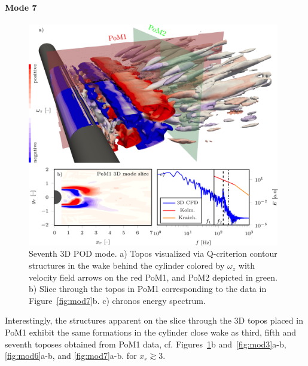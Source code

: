 {{{\paragraph{Mode 7}
\begin{figure}[htbp]
    \centering
    \includegraphics[width=0.98\textwidth]{02_images/00_export/figure22.png}
    \caption{{Seventh 3D POD mode. a)} Topos {visualized via} Q-criterion contour structures in the wake behind the cylinder colored by $\omega_z$ with velocity field arrows on the red PoM1, and PoM2 depicted in green. {b) Slice through the topos in PoM1 corresponding to the data in Figure~\ref{fig:mod7}b. c) chronos energy spectrum.}}
    \label{fig:3Dmod7}
\end{figure}
 Interestingly, the structures apparent on the slice through the 3D topos placed in PoM1 exhibit the same formations in the cylinder close wake as third, fifth and seventh toposes obtained from PoM1 data, cf. Figures~\ref{fig:3Dmod7}b and~\ref{fig:mod3}a-b, \ref{fig:mod6}a-b, and \ref{fig:mod7}a-b.  for $x_{r}\gtrsim 3$.


}}}

